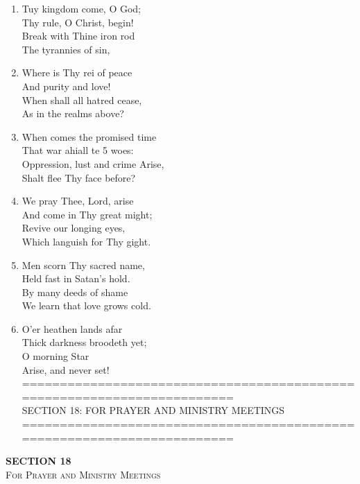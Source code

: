 \documentclass[11pt,a4paper]{article}
\begin{document}
\begin{enumerate}
    \item Tuy kingdom come, O God; \\
        Thy rule, O Christ, begin! \\
        Break with Thine iron rod \\
        The tyrannies of sin,

    \item Where is Thy rei of peace \\
        And purity and love! \\
        When shall all hatred cease, \\
        As in the realms above?

    \item When comes the promised time \\
        That war ahiall te 5 woes: \\
        Oppression, lust and crime Arise, \\
        Shalt flee Thy face before?

    \item We pray Thee, Lord, arise \\
        And come in Thy great might; \\
        Revive our longing eyes, \\
        Which languish for Thy gight.

    \item Men scorn Thy sacred name, \\
        Held fast in Satan's hold. \\
        By many deeds of shame \\
        We learn that love grows cold.

    \item O'er heathen lands afar \\
        Thick darkness broodeth yet; \\
        O morning Star \\
        Arise, and never set! \\
        ======================================================================== \\
        SECTION 18: FOR PRAYER AND MINISTRY MEETINGS \\
        ========================================================================

\end{enumerate}

\newpage
\thispagestyle{empty}
\vspace*{3.5cm}
\begin{center}
    {\LARGE \textbf{SECTION 18}}\\[0.8em]
    {\Large \textsc{For Prayer and Ministry Meetings}}
\end{center}
\vspace{3.5cm}
\end{document}
